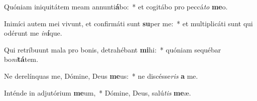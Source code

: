 \item Quóniam iniquitátem meam annunti\textbf{á}bo:~* et cogitábo pro peccá\textit{to} \textbf{me}o.
\item Inimíci autem mei vivunt, et confirmáti sunt \textbf{su}per me:~* et multiplicáti sunt qui odérunt me \textit{in}\textbf{í}que.
\item Qui retríbuunt mala pro bonis, detrahébant \textbf{mi}hi:~* quóniam sequébar bo\textit{ni}\textbf{tá}tem.
\item Ne derelínquas me, Dómine, Deus \textbf{me}us:~* ne discésse\textit{ris} \textbf{a} me.
\item Inténde in adjutórium \textbf{me}um,~* Dómine, Deus, salú\textit{tis} \textbf{me}æ.
